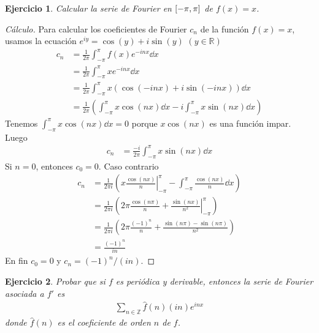 \documentclass{article}
\newcommand{\integerNumbers}{\mathbb{Z}}
\newcommand{\realNumbers}{\mathbb{R}}
\newcommand{\fourier}[1]{\hat{#1}}
\newtheorem{exercise}{Ejercicio}
\newcommand{\leftOpenInterval}{\left]}
\newcommand{\rightOpenInterval}{\right[}
\newcommand{\leftClosedInterval}{\left[}
\newcommand{\rightClosedInterval}{\right]}
\newcommand{\interval}[3]{%
  \ifstrequal{#1}{oo}{%
    \leftOpenInterval #2, #3 \rightOpenInterval%
  }{%
    \ifstrequal{#1}{co}{%
      \leftClosedInterval #2, #3 \rightOpenInterval%
    }{%
      \ifstrequal{#1}{oc}{
        \leftOpenInterval #2, #3 \rightClosedInterval%
      }{%
        \ifstrequal{#1}{cc}{
          \leftClosedInterval #2, #3 \rightClosedInterval
        }{%
        }%
      }%
    }%
  }%
}
\theoremstyle{remark}
\begin{document}
\begin{exercise}
  Calcular la serie de Fourier en \(\interval{cc}{- \pi}{\pi}\) de \(f(x) = x\).
\end{exercise}
\begin{proof}[Cálculo]
  Para calcular los coeficientes de Fourier \(c_n\) de la función \(f(x) = x\), usamos la ecuación \(e^{i y} = \cos(y) + i \sin(y)\) \((y \in \realNumbers)\)
  \begin{align}
    c_n
    &=
    \frac{1}{2 \pi} \int_{- \pi}^{\pi} f(x) e^{- i n x} \dd x
    \\
    &=
    \frac{1}{2 \pi} \int_{- \pi}^{\pi} x e^{- i n x} \dd x
    \\
    &=
    \frac{1}{2 \pi} \int_{- \pi}^{\pi} x (\cos(- i n x) + i \sin(- i n x)) \dd x
    \\
    &=
    \frac{1}{2 \pi}
    \left(
      \int_{- \pi}^{\pi} x \cos(n x) \dd x
      -
      i \int_{- \pi}^{\pi} x \sin(n x) \dd x
    \right)
  \end{align}
  Tenemos \(\int_{- \pi}^{\pi} x \cos(n x) \dd x = 0\) porque \(x \cos(n x)\) es una función impar.
  Luego
  \begin{align}
    c_n
    &=
    \frac{- i}{2 \pi}
    \int_{- \pi}^{\pi} x \sin(n x) \dd x
  \end{align}
  Si \(n = 0\), entonces \(c_0 = 0\).
  Caso contrario
  \begin{align}
    c_n
    &=
    \frac{1}{2 \pi i}
    \left(
      \left. x \frac{\cos(n x)}{n} \right|_{- \pi}^{\pi}
      -
      \int_{- \pi}^{\pi} \frac{\cos(n x)}{n} \dd x
    \right)
    \\
    &=
    \frac{1}{2 \pi i}
    \left(
      2 \pi \frac{\cos(n \pi)}{n}
      +
      \left. \frac{\sin(n x)}{n^2} \right|_{- \pi}^{\pi}
    \right)
    \\
    &=
    \frac{1}{2 \pi i}
    \left(
      2 \pi \frac{(- 1)^n}{n}
      +
      \frac{\sin(n \pi) - \sin(n \pi)}{n^2}
    \right)
    \\
    &=
    \frac{(- 1)^n}{i n}
  \end{align}
  En fin \(c_0 = 0\) y \(c_n = (- 1)^n / (i n)\).
\end{proof}

\begin{exercise}
  Probar que si \(f\) es periódica y derivable, entonces la serie de Fourier asociada a \(f'\) es
  \begin{align}
    \sum_{n \in \integerNumbers} \fourier{f} (n) (i n) e^{i n x}
  \end{align}
  donde \(\fourier{f}(n)\) es el coeficiente de orden \(n\) de \(f\).
\end{exercise}
\end{document}

